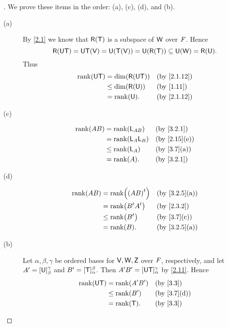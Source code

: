 \begin{proof}[]
	We prove these items in the order:
	(a), (c), (d), and (b).
	\begin{description}
		\item[(a)]
			By \cref{2.1} we know that \(\rg{\T}\) is a subspace of \(\mathsf{W}\) over \(\mathit{F}\).
			Hence
			\[
				\rg{\U \T} = \U \T(\V) = \U(\T(\V)) = \U(\rg{\T}) \subseteq \U(\W) = \rg{\U}.
			\]
			Thus
			\begin{align*}
				\rk{\U \T} & = \dim(\rg{\U \T}) &  & \by{2.1.12} \\
				           & \leq \dim(\rg{\U}) &  & \by{1.11}   \\
				           & = \rk{\U}.         &  & \by{2.1.12}
			\end{align*}
		\item[(c)]
			\begin{align*}
				\rk{AB} & = \rk{\L_{AB}}   &  & \by{3.2.1}   \\
				        & = \rk{\L_A \L_B} &  & \by{2.15}[e] \\
				        & \leq \rk{\L_A}   &  & \by{3.7}[a]  \\
				        & = \rk{A}.        &  & \by{3.2.1}
			\end{align*}
		\item[(d)]
			\begin{align*}
				\rk{AB} & = \rk{\tp{(AB)}}     &  & \by{3.2.5}[a] \\
				        & = \rk{\tp{B} \tp{A}} &  & \by{2.3.2}    \\
				        & \leq \rk{\tp{B}}     &  & \by{3.7}[c]   \\
				        & = \rk{B}.            &  & \by{3.2.5}[a]
			\end{align*}
		\item[(b)]
			Let \(\alpha, \beta, \gamma\) be ordered bases for \(\mathsf{V}, \mathsf{W}, \mathsf{Z}\) over \(\mathit{F}\), respectively, and let \(A' = [\mathsf{U}]_{\beta}^{\gamma}\) and \(B' = [\mathsf{T}]_{\alpha}^{\beta}\).
			Then \(A' B' = [\mathsf{U} \mathsf{T}]_{\alpha}^{\gamma}\) by \cref{2.11}.
			Hence
			\begin{align*}
				\rk{\U \T} & = \rk{A' B'} &  & \by{3.3}    \\
				           & \leq \rk{B'} &  & \by{3.7}[d] \\
				           & = \rk{\T}.   &  & \by{3.3}
			\end{align*}
	\end{description}
\end{proof}

